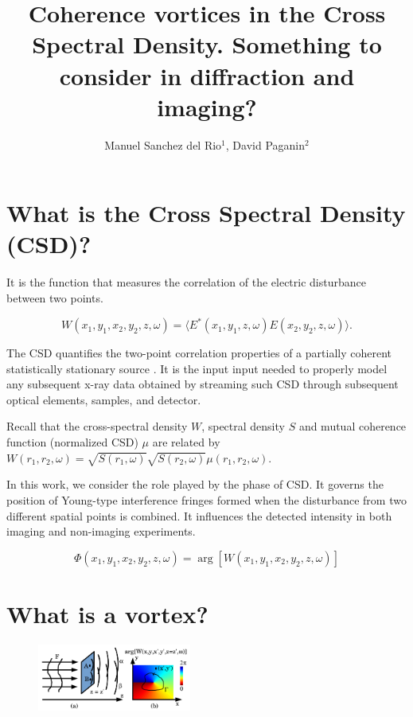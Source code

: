 \documentclass[a4paper,10pt]{article}
\title{Coherence vortices in the Cross Spectral Density. Something to consider in diffraction and imaging?}
\author{Manuel Sanchez del Rio$^1$, David Paganin$^2$}
\begin{document}
\maketitle

\begin{abstract}

\end{abstract}

\section{What is the Cross Spectral Density (CSD)?}

It is the function that measures the correlation of the electric disturbance between two points.

\begin{equation}
W(x_1,y_1,x_2,y_2,z,\omega) = 
\langle E^{*}(x_1,y_1,z,\omega) E(x_2,y_2,z,\omega)\rangle.
\end{equation}

The CSD quantifies the two-point correlation properties of a partially coherent statistically stationary source \cite{Wolf1982,mandel_wolf}. 
It is the input input needed to properly model any subsequent x-ray data obtained by streaming such CSD through subsequent optical elements, samples, and detector.

Recall that the cross-spectral density $W$, spectral density $S$ and mutual coherence function (normalized CSD) $\mu$ are related by $W(r_1,r_2,\omega)=\sqrt{S(r_1,\omega)}\sqrt{S(r_2,\omega)}\mu(r_1,r_2,\omega)$. 

In this work, we consider the role played by the phase of CSD. It governs the position of Young-type interference fringes formed when the disturbance from two different spatial points is combined. It influences the detected intensity in both imaging and non-imaging experiments.

\begin{equation}\label{phase_of_W}
\Phi(x_1,y_1,x_2,y_2,z,\omega)=\arg[W(x_1,y_1,x_2,y_2,z,\omega)]
\end{equation}




\section{What is a vortex?}


\begin{figure}\label{loss_of_fringe_visibility}
\includegraphics[width=0.45\textwidth]{Figures/coherence_vortex.png}
\end{figure}
 
\end{document}
